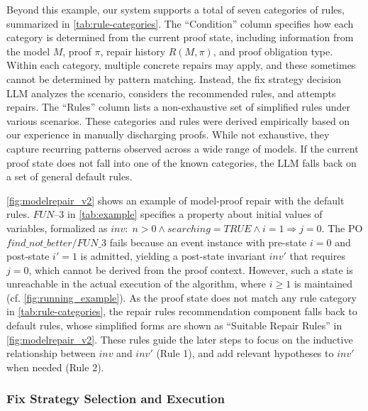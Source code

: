 Beyond this example, our system supports a total of seven categories of rules, summarized in \autoref{tab:rule-categories}. 
The ``Condition'' column specifies how each category is determined from the current proof state, including information from the model $M$, proof $\pi$, repair history $R(M, \pi)$, and proof obligation type.
Within each category, multiple concrete repairs may apply, and these sometimes cannot be determined by pattern matching. 
Instead, the fix strategy decision LLM analyzes the scenario, considers the recommended rules, and attempts repairs. 
The ``Rules'' column lists a non-exhaustive set of simplified rules under various scenarios.
These categories and rules were derived empirically based on our experience in manually discharging proofs.
While not exhaustive, they capture recurring patterns observed across a wide range of models.
If the current proof state does not fall into one of the known categories, the LLM falls back on a set of general default rules.

\autoref{fig:modelrepair_v2} shows an example of model-proof repair with the default rules.
$FUN$--3 in \autoref{tab:example} specifies a property about initial values of variables, formalized as $inv: \; n>0 \land searching=TRUE \land i=1 \Rightarrow j=0$.
The PO $find\_not\_better/FUN\_3$ fails because an event instance with pre-state $i=0$ and post-state $i'=1$ is admitted, yielding a post-state invariant $inv'$ that requires $j=0$, which cannot be derived from the proof context.
However, such a state is unreachable in the actual execution of the algorithm, where $i \geq 1$ is maintained (cf. \autoref{fig:running_example}).
As the proof state does not match any rule category in \autoref{tab:rule-categories}, the repair rules recommendation component falls back to default rules, whose simplified forms are shown as ``Suitable Repair Rules'' in \autoref{fig:modelrepair_v2}.
These rules guide the later steps to focus on the inductive relationship between $inv$ and $inv'$ (Rule 1), and add relevant hypotheses to $inv'$ when needed (Rule 2).

\subsubsection{Fix Strategy Selection and Execution}\label{sec:fix_selection}


